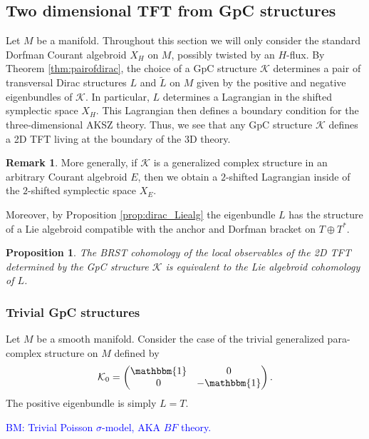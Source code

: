 \documentclass{article}
\newcommand{\TT}{{T\oplus T^*}}
\newcommand{\KK}{\mathcal{K}}
\newcommand{\id}{\mathbbm{1}}
\newtheorem{proposition}[theorem]{Proposition}
\theoremstyle{definition}
\newtheorem{remark}[theorem]{Remark}
\theoremstyle{remark}
\def\brian{\textcolor{blue}{BM: }\textcolor{blue}}
\begin{document}
\subsection{Two dimensional TFT from GpC structures}

Let $M$ be a manifold.
Throughout this section we will only consider the standard Dorfman Courant algebroid $X_H$ on $M$, possibly twisted by an $H$-flux.
By Theorem \ref{thm:pairofdirac}, the choice of a GpC structure $\KK$ determines a pair of transversal Dirac structures $L$ and $\tilde{L}$ on $M$ given by the positive and negative eigenbundles of $\KK$. 
In particular, $L$ determines a Lagrangian in the shifted symplectic space $X_{H}$. 
This Lagrangian then defines a boundary condition for the three-dimensional AKSZ theory.
Thus, we see that any GpC structure $\KK$ defines a 2D TFT living at the boundary of the 3D theory. 

\begin{remark}
More generally, if $\KK$ is a generalized complex structure in an arbitrary Courant algebroid $E$, then we obtain a $2$-shifted Lagrangian inside of the $2$-shifted symplectic space $X_E$. 
\end{remark}


Moreover, by Proposition \ref{prop:dirac_Liealg} the eigenbundle $L$ has the structure of a Lie algebroid compatible with the anchor and Dorfman bracket on $\TT$. 

\begin{proposition}
The BRST cohomology of the local observables of the 2D TFT determined by the GpC structure $\KK$ is equivalent to the Lie algebroid cohomology of $L$. 
\end{proposition}

\subsubsection*{Trivial GpC structures}

Let $M$ be a smooth manifold.
Consider the case of the trivial generalized para-complex structure on $M$ defined by
\begin{align*}
\KK_0=
\begin{pmatrix}
\id & 0 \\
0 & -\id
\end{pmatrix}.
\end{align*}
The positive eigenbundle is simply $L = T$.

\brian{Trivial Poisson $\sigma$-model, AKA $BF$ theory.}
\end{document}
